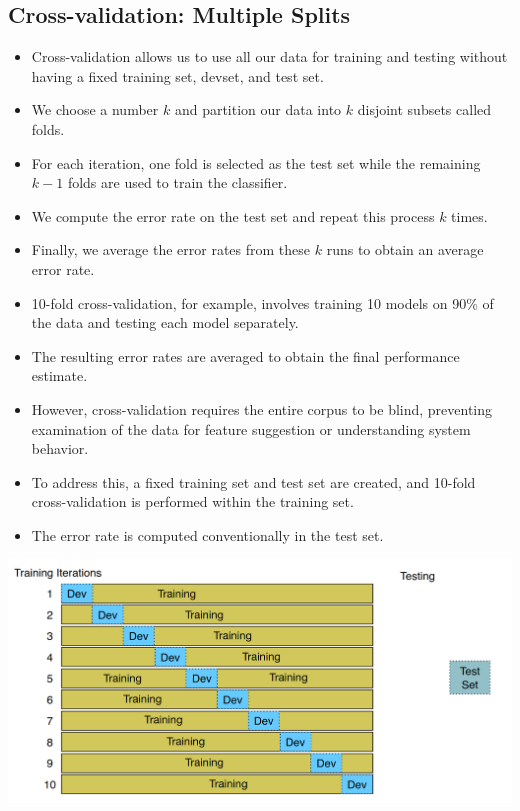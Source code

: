 \subsection{Cross-validation: Multiple Splits}

\begin{itemize}
\item Cross-validation allows us to use all our data for training and testing without having a fixed training set, devset, and test set.
\item We choose a number $k$ and partition our data into $k$ disjoint subsets called folds.
\item For each iteration, one fold is selected as the test set while the remaining $k-1$ folds are used to train the classifier.
\item We compute the error rate on the test set and repeat this process $k$ times.
\item Finally, we average the error rates from these $k$ runs to obtain an average error rate.
\item 10-fold cross-validation, for example, involves training 10 models on 90\% of the data and testing each model separately.
\item The resulting error rates are averaged to obtain the final performance estimate.
\item However, cross-validation requires the entire corpus to be blind, preventing examination of the data for feature suggestion or understanding system behavior.
\item To address this, a fixed training set and test set are created, and 10-fold cross-validation is performed within the training set.
\item The error rate is computed conventionally in the test set.
\end{itemize}




\begin{center}
\includegraphics[scale=0.28]{pics/cv.png}
\end{center}




